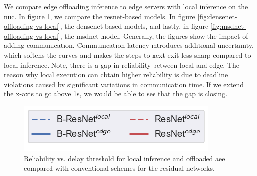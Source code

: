 We compare edge offloading inference to edge servers with local inference on the \gls{nuc}. In figure \ref{fig:resnet-offloading-vs-local}, we compare the \gls{resnet}-based models. In figure \ref{fig:densenet-offloading-vs-local}, the \gls{densenet}-based models, and lastly, in figure \ref{fig:msdnet-offloading-vs-local}, the \gls{msdnet} model.
Generally, the figures show the impact of adding communication. Communication latency introduces additional uncertainty, which softens the curves and makes the steps to next exit less sharp compared to local inference. Note, there is a gap in reliability between local and edge. The reason why local execution can obtain higher reliability is due to deadline violations caused by significant variations in communication time. If we extend the x-axis to go above 1s, we would be able to see that the gap is closing. 
\begin{figure}
	\captionsetup[subfigure]{justification=centering, farskip=0pt,captionskip=0pt}
	\centering
	\includegraphics[width=.3\linewidth]{figures/edge/gpu_b-resnet_offloading_vs_local_legend}
	\hfill
	\hfill
	\caption[Offloading comparison of residual networks]{Reliability vs. delay threshold for local inference and offloaded \gls{aee} compared with conventional schemes for the residual networks.}
	\label{fig:resnet-offloading-vs-local}
\end{figure}

